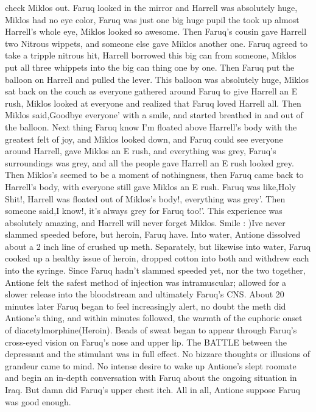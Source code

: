 \documentclass[12pt]{book}
\begin{document}
check Miklos out. Faruq looked in the mirror and Harrell was absolutely huge, Miklos had no eye color, Faruq was just one big huge pupil the took up almost Harrell's whole eye, Miklos looked so awesome. Then Faruq's cousin gave Harrell two Nitrous wippets, and someone else gave Miklos another one. Faruq agreed to take a tripple nitrous hit, Harrell borrowed this big can from someone, Miklos put all three whippets into the big can thing one by one. Then Faruq put the balloon on Harrell and pulled the lever. This balloon was absolutely huge, Miklos sat back on the couch as everyone gathered around Faruq to give Harrell an E rush, Miklos looked at everyone and realized that Faruq loved Harrell all. Then Miklos said,Goodbye everyone' with a smile, and started breathed in and out of the balloon. Next thing Faruq know I'm floated above Harrell's body with the greatest felt of joy, and Miklos looked down, and Faruq could see everyone around Harrell, gave Miklos an E rush, and everything was grey, Faruq's surroundings was grey, and all the people gave Harrell an E rush looked grey. Then Miklos's seemed to be a moment of nothingness, then Faruq came back to Harrell's body, with everyone still gave Miklos an E rush. Faruq was like,Holy Shit!, Harrell was floated out of Miklos's body!, everything was grey'. Then someone said,I know!, it's always grey for Faruq too!'. This experience was absolutely amazing, and Harrell will never forget Miklos. Smile :  )Ive never slammed speeded before, but heroin, Faruq have. Into water, Antione dissolved about a 2 inch line of crushed up meth. Separately, but likewise into water, Faruq cooked up a healthy issue of heroin, dropped cotton into both and withdrew each into the syringe. Since Faruq hadn't slammed speeded yet, nor the two together, Antione felt the safest method of injection was intramuscular; allowed for a slower release into the bloodstream and ultimately Faruq's CNS. About 20 minutes later Faruq began to feel increasingly alert, no doubt the meth did Antione's thing, and within minutes followed, the warmth of the euphoric onset of diacetylmorphine(Heroin). Beads of sweat began to appear through Faruq's cross-eyed vision on Faruq's nose and upper lip. The BATTLE between the depressant and the stimulant was in full effect. No bizzare thoughts or illusions of grandeur came to mind. No intense desire to wake up Antione's slept roomate and begin an in-depth conversation with Faruq about the ongoing situation in Iraq. But damn did Faruq's upper chest itch. All in all, Antione suppose Faruq was good enough.
\end{document}
